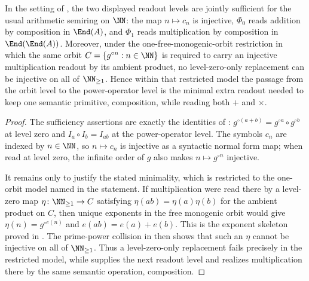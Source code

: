 \begin{corollary}
\label{cor:minimal}
In the setting of , the two displayed readout levels are
jointly sufficient for the usual arithmetic semiring on \(\NN\): the map
\(n\mapsto c_n\) is injective, \(\Phi_0\) reads addition by composition in
\(\End(A)\), and \(\Phi_1\) reads multiplication by composition in
\(\End(\End(A))\).  Moreover, under the one-free-monogenic-orbit restriction in
which the same orbit \(C=\{g^{\circ n}:n\in\NN\}\) is required to carry an
injective multiplication readout by its ambient product, no level-zero-only
replacement can be injective on all of \(\NN_{\ge1}\).  Hence within that
restricted model the passage from the orbit level to the power-operator level is
the minimal extra readout needed to keep one semantic primitive, composition,
while reading both \(+\) and \(\times\).
\end{corollary}

\begin{proof}
The sufficiency assertions are exactly the identities of :
\(g^{\circ(a+b)}=g^{\circ a}\circ g^{\circ b}\) at level zero and
\(I_a\circ I_b=I_{ab}\) at the power-operator level.  The symbols \(c_n\) are
indexed by \(n\in\NN\), so \(n\mapsto c_n\) is injective as a syntactic normal
form map; when read at level zero, the infinite order of \(g\) also makes
\(n\mapsto g^{\circ n}\) injective.

It remains only to justify the stated minimality, which is restricted to the
one-orbit model named in the statement.  If multiplication were read there by a
level-zero map \(\eta\colon\NN_{\ge1}\to C\) satisfying
\(\eta(ab)=\eta(a)\eta(b)\) for the ambient product on \(C\), then unique
exponents in the free monogenic orbit would give
\(\eta(n)=g^{\circ e(n)}\) and \(e(ab)=e(a)+e(b)\).  This is the exponent skeleton
proved in .  The prime-power collision in
 then shows that such an \(\eta\) cannot be
injective on all of \(\NN_{\ge1}\).  Thus a level-zero-only replacement fails
precisely in the restricted model, while  supplies the next
readout level and realizes multiplication there by the same semantic operation,
composition.
\end{proof}


